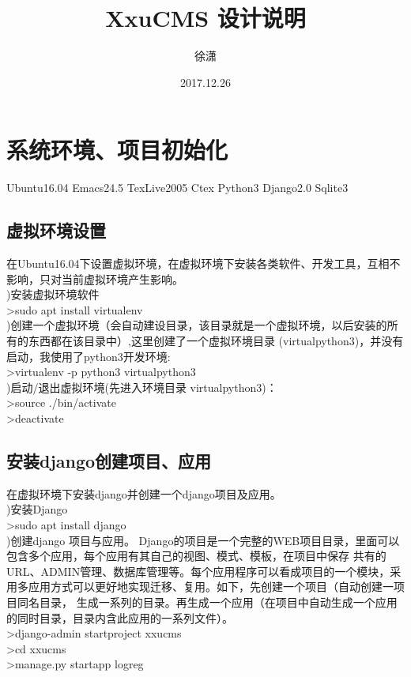 \documentclass[a4paper]{ctexart}
\author{徐潇}
\title{XxuCMS 设计说明}
\date{2017.12.26}
\begin{document}
  \maketitle  %

  \section{系统环境、项目初始化}
  Ubuntu16.04 Emacs24.5 TexLive2005 Ctex Python3 Django2.0 Sqlite3
   \subsection{虚拟环境设置}
      在Ubuntu16.04下设置虚拟环境，在虚拟环境下安装各类软件、开发工具，互相不影响，只对当前虚拟环境产生影响。\\    
      )安装虚拟环境软件\\      
      \indent >sudo apt install virtualenv \\
      )创建一个虚拟环境（会自动建设目录，该目录就是一个虚拟环境，以后安装的所有的东西都在该目录中）,这里创建了一个虚拟环境目录
      (virtualpython3)，并没有启动，我使用了python3开发环境:\\
       \indent>virtualenv -p python3 virtualpython3 \\            
       )启动/退出虚拟环境(先进入环境目录 virtualpython3)：\\
       \indent >source ./bin/activate \\
       \indent >deactivate \\
    \subsection{安装django创建项目、应用}
      在虚拟环境下安装django并创建一个django项目及应用。\\
      )安装Django \\
      \indent >sudo apt install django \\
      )创建django 项目与应用。 Django的项目是一个完整的WEB项目目录，里面可以包含多个应用，每个应用有其自己的视图、模式、模板，在项目中保存
      共有的URL、ADMIN管理、数据库管理等。每个应用程序可以看成项目的一个模块，采用多应用方式可以更好地实现迁移、复用。如下，先创建一个项目（自动创建一项目同名目录，
      生成一系列的目录。再生成一个应用（在项目中自动生成一个应用的同时目录，目录内含此应用的一系列文件）。\\
      \indent >django-admin startproject xxucms \\
      \indent >cd xxucms \\ 
      \indent >manage.py startapp logreg \\
      \indent
\end{document}
